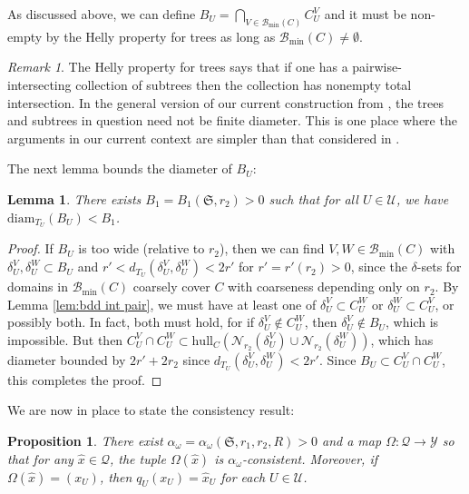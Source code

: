 \documentclass{amsart}
\newtheorem{proposition}[theorem]{Proposition}
\newtheorem{lemma}[theorem]{Lemma}
\theoremstyle{definition}
\theoremstyle{remark}
\newtheorem{remark}[theorem]{Remark}
\theoremstyle{definition}
\newcommand{\calB}{\mathcal{B}}
\newcommand{\calN}{\mathcal{N}}
\newcommand{\calQ}{\mathcal{Q}}
\newcommand{\calU}{\mathcal{U}}
\newcommand{\calY}{\mathcal{Y}}
\newcommand{\hx}{\hat{x}}
\newcommand{\BM}{\calB_{\min}}
\newcommand{\diam}{\mathrm{diam}}
\newcommand{\hull}{\mathrm{hull}}
\begin{document}
As discussed above, we can define $B_U = \bigcap_{V \in \BM(C)}C^V_U$ and it must be non-empty by the Helly property for trees as long as $\BM(C) \neq \emptyset$.

\begin{remark}\label{rem:Helly}
The Helly property for trees says that if one has a pairwise-intersecting collection of subtrees then the collection has nonempty total intersection.  In the general version of our current construction from \cite{Dur_infcube}, the trees and subtrees in question need not be finite diameter.  This is one place where the arguments in our current context are simpler than that considered in \cite{Dur_infcube}.
\end{remark}

The next lemma bounds the diameter of $B_U$:

\begin{lemma}\label{lem:bdd int total}
There exists $B_1 = B_1(\mathfrak S,r_2)>0$ such that for all $U \in \calU$, we have 
$\diam_{T_U}(B_U) < B_1$.
\end{lemma}

\begin{proof}

If $B_U$ is too wide (relative to $r_2$), then we can find $V, W \in \BM(C)$ with $\delta^V_U, \delta^W_U \subset B_U$ and $r'< d_{T_U}(\delta^V_U, \delta^W_U) < 2r'$ for $r' = r'(r_2)>0$, since the $\delta$-sets for domains in $\BM(C)$ coarsely cover $C$ with coarseness depending only on $r_2$.  By Lemma \ref{lem:bdd int pair}, we must have at least one of $\delta^V_U \subset C^W_U$ or $\delta^W_U \subset C^V_U$, or possibly both.  In fact, both must hold, for if $\delta^V_U \notin C^W_U$, then $\delta^V_U \notin B_U$, which is impossible.  But then $C^V_U \cap C^W_U \subset \hull_C(\calN_{r_2}(\delta^V_U) \cup \calN_{r_2}(\delta^W_U))$, which has diameter bounded by $2r' + 2r_2$ since $d_{T_U}(\delta^V_U, \delta^W_U) < 2r'$.  Since $B_U \subset C^V_U \cap C^W_U$, this completes the proof.
\end{proof}

We are now in place to state the consistency result:

\begin{proposition}\label{prop:Q-consistent}
There exist $\alpha_{\omega}=\alpha_{\omega}(\mathfrak S,r_1,r_2,R)>0$ and a map $\Omega: \calQ \to \calY$ so that for any $\hx \in \calQ$, the tuple $\Omega(\hx)$ is $\alpha_{\omega}$-consistent.  Moreover, if $\Omega(\hx) = (x_U)$, then $q_U(x_U) = \hx_U$ for each $U \in \calU$.
\end{proposition}
\end{document}
